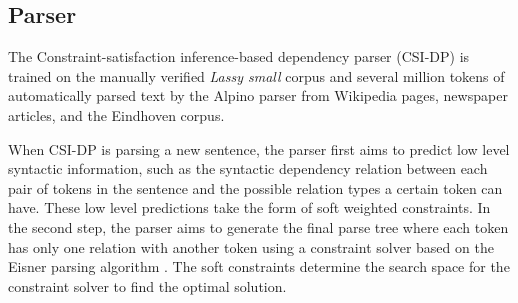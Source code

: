 \documentclass{book}
\begin{document}



\subsection{Parser}
\label{sec-bg-dep}

The Constraint-satisfaction inference-based dependency parser (CSI-DP) \cite{Canisius2009} is trained on the manually verified {\it Lassy small} corpus\cite{alpino2013} and several million tokens of automatically parsed text by the Alpino parser \cite{vanEynde2004} from Wikipedia pages, newspaper articles, and the Eindhoven corpus.


When CSI-DP is parsing a new sentence, the parser first aims to predict low level syntactic information, such as the syntactic dependency relation between each pair of tokens in the sentence and the possible relation types a certain token can have. These low level predictions take the form of soft weighted constraints. In the second step, the parser aims to generate the final parse tree where each token has only one relation with another token using a constraint solver based on the Eisner parsing algorithm \cite{Eisner2000}. The soft constraints determine the search space for the constraint solver to find the optimal solution.
\end{document}
